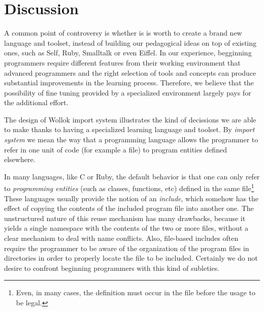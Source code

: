 \section{Discussion}
\label{sec:discussion}


A common point of controversy is whether is is worth to create a brand new language and toolset, 
instead of building our pedagogical ideas on top of existing ones, such as Self, Ruby, Smalltalk or even Eiffel.
In our experience, begginning programmers require different features from their working environment that advanced programmers
and the right selection of tools and concepts can produce substantial improvements in the learning process.
Therefore, we believe that the possibility of fine tuning provided by a specialized environment largely pays for the additional effort.

The design of Wollok import system illustrates the kind of decissions we are able to make thanks to having a specialized learning language and toolset.
By \emph{import system} we mean the way that a programming language allows the programmer to refer in one unit of code (for example a file) to program entities defined elsewhere.

\medskip
In many languages, like C or Ruby, the default behavior is that one can only refer to \emph{programming entities} (such as classes, functions, etc) defined in the same 
file\footnote{Even, in many cases, the definition must occur in the file before the usage to be legal.}
These languages usually provide the notion of an \emph{include}, 
which somehow has the effect of copying the contents of the included program file into another one.
The unstructured nature of this reuse mechanism has many drawbacks, 
because it yields a single namespace with the contents of the two or more files, 
without a clear mechanism to deal with name conflicts.
Also, file-based includes often require the programmer to be aware of the organization of the program files in directories in order to properly locate the file to be included.
Certainly we do not desire to confront beginning programmers with this kind of subleties.

